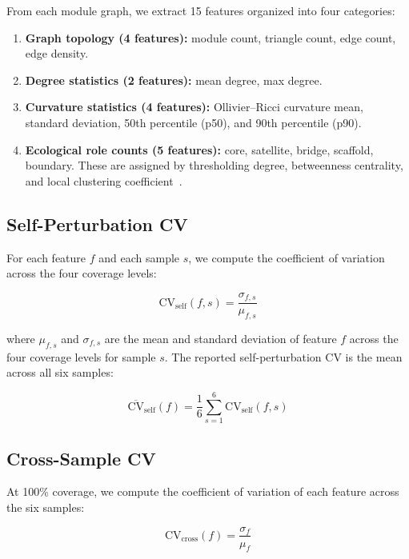 \documentclass{../yalumba}
\begin{document}
From each module graph, we extract 15 features organized into four
categories:

\begin{enumerate}
  \item \textbf{Graph topology (4 features):} module count, triangle
    count, edge count, edge density.
  \item \textbf{Degree statistics (2 features):} mean degree, max degree.
  \item \textbf{Curvature statistics (4 features):} Ollivier--Ricci
    curvature mean, standard deviation, 50th percentile (p50), and 90th
    percentile (p90).
  \item \textbf{Ecological role counts (5 features):} core, satellite,
    bridge, scaffold, boundary.  These are assigned by thresholding degree,
    betweenness centrality, and local clustering
    coefficient~\cite{hartwell1999cell, milo2002network}.
\end{enumerate}

\subsection{Self-Perturbation CV}

For each feature $f$ and each sample $s$, we compute the coefficient
of variation across the four coverage levels:

\begin{equation}
  \text{CV}_{\text{self}}(f, s) =
    \frac{\sigma_{f,s}}{\mu_{f,s}}
  \label{eq:cv-self}
\end{equation}

where $\mu_{f,s}$ and $\sigma_{f,s}$ are the mean and standard
deviation of feature $f$ across the four coverage levels for sample $s$.
The reported self-perturbation CV is the mean across all six samples:

\begin{equation}
  \overline{\text{CV}}_{\text{self}}(f) =
    \frac{1}{6} \sum_{s=1}^{6} \text{CV}_{\text{self}}(f, s)
  \label{eq:cv-self-mean}
\end{equation}

\subsection{Cross-Sample CV}

At 100\% coverage, we compute the coefficient of variation of each
feature across the six samples:

\begin{equation}
  \text{CV}_{\text{cross}}(f) =
    \frac{\sigma_f}{\mu_f}
  \label{eq:cv-cross}
\end{equation}
\end{document}
